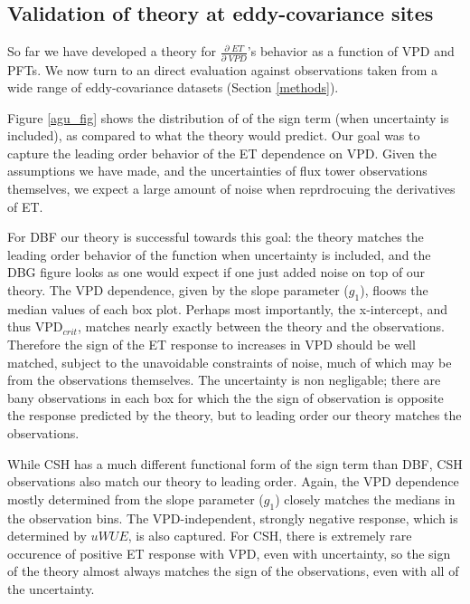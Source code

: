 \documentclass[draft,linenumbers]{agujournal}
\begin{document}
\subsection{Validation of theory at eddy-covariance sites}
\label{testing}
So far we have developed a theory for $\frac{\partial \; ET}{\partial \; VPD}$'s behavior as a function of VPD and PFTs. We now turn to an direct evaluation against observations taken from a wide range of eddy-covariance datasets (Section \ref{methods}).

Figure \ref{agu_fig} shows the distribution of of the sign term (when uncertainty is included), as compared to what the theory would predict. Our goal was to capture the leading order behavior of the ET dependence on VPD. Given the assumptions we have made, and the uncertainties of flux tower observations themselves, we expect a large amount of noise when reprdrocuing the derivatives of ET.

For DBF our theory is successful towards this goal: the theory matches the leading order behavior of the function when uncertainty is included, and the DBG figure looks as one would expect if one just added noise on top of our theory. The VPD dependence, given by the slope parameter ($g_1$), floows the median values of each box plot. Perhaps most importantly, the x-intercept, and thus VPD$_{crit}$, matches nearly exactly between the theory and the observations. Therefore the sign of the ET response to increases in VPD should be well matched, subject to the unavoidable constraints of noise, much of which may be from the observations themselves. The uncertainty is non negligable; there are bany observations in each box for which the the sign of observation is opposite the response predicted by the theory, but to leading order our theory matches the observations. 

While CSH has a much different functional form of the sign term than DBF, CSH observations also match our theory to leading order. Again, the VPD dependence mostly determined from the slope parameter ($g_1$) closely matches the medians in the observation bins. The VPD-independent, strongly negative response, which is determined by $uWUE$, is also captured. For CSH, there is extremely rare occurence of positive ET response with VPD, even with uncertainty, so the sign of the theory almost always matches the sign of the observations, even with all of the uncertainty.
\end{document}
